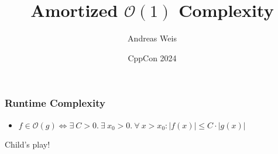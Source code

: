 \documentclass[aspectratio=169]{beamer}
\title{Amortized $\mathcal{O}(1)$ Complexity}
\author{Andreas Weis}
\institute{}
\date{CppCon 2024}
\begin{document}

\iftrue %

\begin{frame}
  \frametitle{Runtime Complexity}
  
  \begin{center}
  \begin{itemize}
    \item $f \in \mathcal{O}(g) \iff \exists\ C > 0.\ \exists\ x_0 > 0.\ \forall\ x > x_0: |f(x)| \le C\cdot|g(x)|$
  \end{itemize}
  \end{center}

\end{frame}

\begin{frame}

  \begin{center}
  \huge{Child's play!}
  \end{center}
  
\end{frame}
\end{document}
